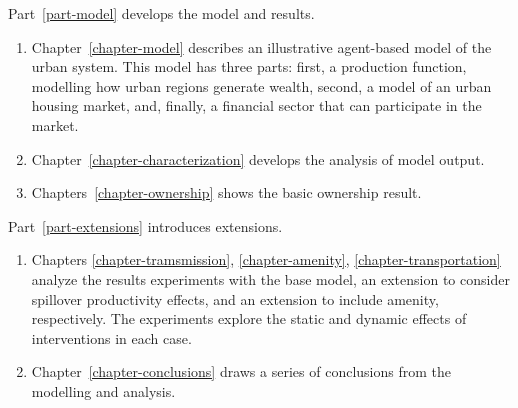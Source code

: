 Part~\ref{part-model} develops the model and results.
\begin{enumerate}
    \item Chapter~\ref{chapter-model} describes an illustrative agent-based model of the urban system. This model has three  parts: first, a production function, modelling how urban regions generate wealth,  second, a model of an urban housing market, and, finally, a financial sector that can participate in the market. 

    \item Chapter~\ref{chapter-characterization} develops the analysis of model output.

    \item Chapters~\ref{chapter-ownership} shows the basic ownership result.
\end{enumerate}
    
Part~\ref{part-extensions} introduces extensions.
\begin{enumerate}
    \item Chapters \ref{chapter-tramsmission}, \ref{chapter-amenity}, \ref{chapter-transportation} analyze the results %
    experiments  with the base model, an extension to consider spillover productivity effects, and an extension to include amenity, respectively. The experiments explore the static and dynamic effects of interventions in each case. %

    \item Chapter~\ref{chapter-conclusions} draws a series of conclusions from the modelling and analysis.
\end{enumerate}

% 
